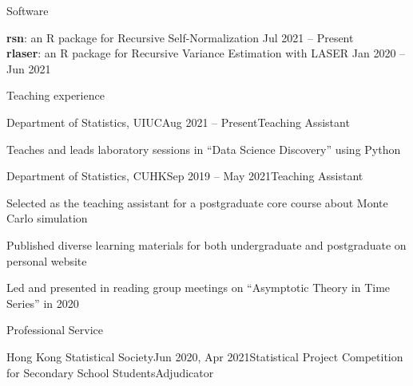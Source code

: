 \documentclass[10pt]{resume} %
\begin{document}

\begin{rSection}{Software}

\textbf{rsn}: an R package for Recursive Self-Normalization \hfill {Jul 2021 -- Present} \\
\textbf{rlaser}: an R package for Recursive Variance Estimation with LASER \hfill {Jan 2020 -- Jun 2021}

\end{rSection}


\begin{rSection}{Teaching experience}

\begin{rSubsection}{Department of Statistics, UIUC}{Aug 2021 -- Present}{Teaching Assistant}{}
\item Teaches and leads laboratory sessions in ``Data Science Discovery'' using Python
\end{rSubsection}

\begin{rSubsection}{Department of Statistics, CUHK}{Sep 2019 -- May 2021}{Teaching Assistant}{}
\item Selected as the teaching assistant for a postgraduate core course about Monte Carlo simulation
\item Published diverse learning materials for both undergraduate and postgraduate on personal website
\item Led and presented in reading group meetings on ``Asymptotic Theory in Time Series'' in 2020
\end{rSubsection}

\end{rSection}


\begin{rSection}{Professional Service}

\begin{rSecitem}{Hong Kong Statistical Society}{Jun 2020, Apr 2021}{Statistical Project Competition for Secondary School Students}{Adjudicator}
\end{rSecitem}

\end{rSection}
\end{document}
